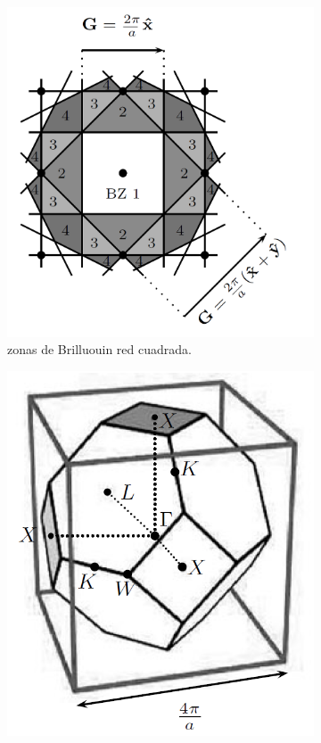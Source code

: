 \begin{figure}[h!] \centering
	\begin{subfigure}{0.45\linewidth} \centering
		\includegraphics[scale=0.3]{Cuerpo/Ch_02/Brillouin.png}
		\caption{zonas de Brilluouin red cuadrada.} \label{Fig:02-03-1a}
	\end{subfigure}
	\begin{subfigure}{0.45\linewidth} \centering
	\includegraphics[scale=0.45]{Cuerpo/Ch_02/Brillouin-bcc.png}

\end{subfigure}
\end{figure}

